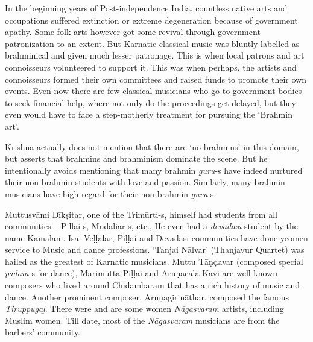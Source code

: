 In the beginning years of Post-independence India, countless native arts and occupations suffered extinction or extreme degeneration because of government apathy. Some folk arts however got some revival through government patronization to an extent. But Karnatic classical music was bluntly labelled as brahminical and given much lesser patronage. This is when local patrons and art connoisseurs volunteered to support it. This was when perhaps, the artists and connoisseurs formed their own committees and raised funds to promote their own events. Even now there are few classical musicians who go to government bodies to seek financial help, where not only do the proceedings get delayed, but they even would have to face a step-motherly treatment for pursuing the ‘Brahmin art’.

Krishna actually does not mention that there are ‘no brahmins’ in this domain, but asserts that brahmins and brahminism dominate the scene. But he intentionally avoids mentioning that many brahmin \textit{guru}-s have indeed nurtured their non-brahmin students with love and passion. Similarly, many brahmin musicians have high regard for their non-brahmin \textit{guru}-s.

Muttusvāmi Dīkṣitar, one of the Trimūrti-s, himself had students from all communities – Pillai-s, Mudaliar-s, etc., He even had a \textit{devadāsī} student by the name Kamalam. Isai Veḷḷalār, Piḷḷai and Devadāsī communities have done yeomen service to Music and dance professions. ‘Tanjai Nālvar’ (Thanjavur Quartet) was hailed as the greatest of Karnatic musicians. Muttu Tāṇḍavar (composed special \textit{padam-}s for dance), Mārimutta Piḷḷai and Aruṇācala Kavi are well known composers who lived around Chidambaram that has a rich history of music and dance. Another prominent composer, Aruṇagirināthar, composed the famous \textit{Tiruppugaḻ}. There were and are some women \textit{Nāgasvaram} artists, including Muslim women. Till date, most of the \textit{Nāgasvaram} musicians are from the barbers’ community.

